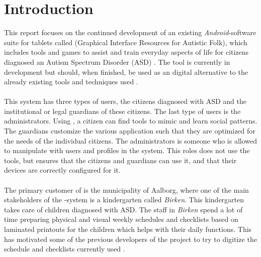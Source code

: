 \chapter{Introduction}
\label{cha:introduction}

This report focuses on the continued development of an existing \emph{Android}-software suite for tablets called \giraf (Graphical Interface Resources for Autistic Folk), which includes tools and games to assist and train everyday aspects of life for citizens diagnosed an Autism Spectrum Disorder (ASD) \parencite{asd}. The tool is currently in development but should, when finished, be used as an digital alternative to the already existing tools and techniques used \parencite{birken_slides}.
\\\\ 
This system has three types of users, the citizens diagnosed with ASD and the institutional or legal guardians of these citizens. The last type of users is the administrators. Using \giraf, a citizen can find tools to mimic and learn social patterns. The guardians customize the various application such that they are optimized for the needs of the individual citizens. The administrators is someone who is allowed to manipulate with users and profiles in the system. This roles does not use the tools, but ensures that the citizens and guardians can use it, and that their devices are correctly configured for it. 
\\\\
The primary customer of \giraf is the municipality of Aalborg, where one of the main stakeholders of the \giraf-system is a kindergarten called \emph{Birken}. This kindergarten takes care of children diagnosed with ASD. The staff in \emph{Birken} spend a lot of time preparing physical and visual weekly schedules and checklists based on laminated printouts for the children which helps with their daily functions. This has motivated some of the previous developers of the \giraf project to try to digitize the schedule and checklists currently used \parencite{birken_slides}.



